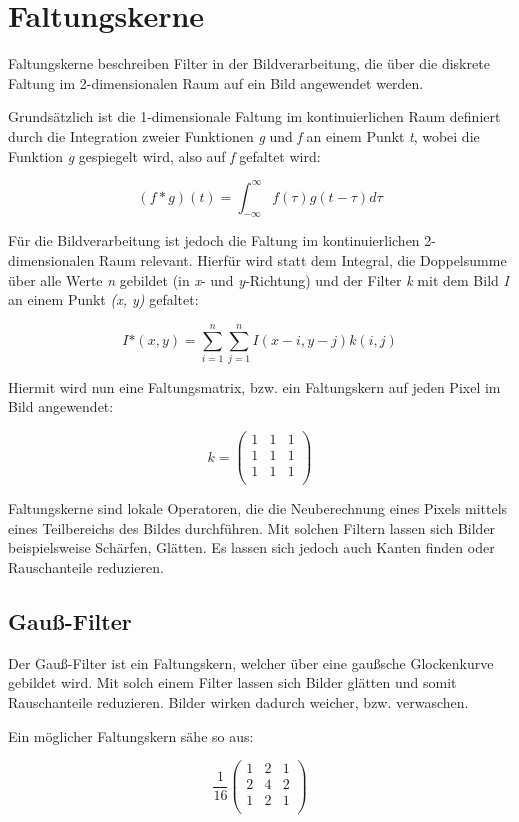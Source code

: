 \section{Faltungskerne} %
\label{sec:Faltungskerne}
Faltungskerne beschreiben Filter in der Bildverarbeitung, die über die diskrete Faltung im 2-dimensionalen
Raum auf ein Bild angewendet werden.

Grundsätzlich ist die 1-dimensionale Faltung im kontinuierlichen Raum definiert durch die Integration zweier Funktionen {\em g} und {\em f} an einem Punkt {\em t}, wobei die Funktion {\em g} gespiegelt wird, also auf {\em f} gefaltet wird:

$$ (f * g)(t) = \int_{-\infty}^{\infty} f(\tau)g(t - \tau) d\tau $$

Für die Bildverarbeitung ist jedoch die Faltung im kontinuierlichen 2-dimensionalen Raum relevant.
Hierfür wird statt dem Integral, die Doppelsumme über alle Werte {\em n} gebildet (in {\em x}- und {\em y}-Richtung) und der Filter {\em k} mit dem Bild {\em I} an einem Punkt {\em (x, y)} gefaltet:

$$ I\mbox{*}(x, y) = \sum_{i=1}^{n}\sum_{j=1}^{n} I(x - i, y - j)k(i, j) $$

Hiermit wird nun eine Faltungsmatrix, bzw. ein Faltungskern auf jeden Pixel im Bild angewendet:

$$ k = \left( \begin{array}{rrr}
1 & 1 & 1 \\
1 & 1 & 1 \\
1 & 1 & 1 \\
\end{array}\right) $$

Faltungskerne sind lokale Operatoren, die die Neuberechnung eines Pixels mittels eines Teilbereichs des Bildes durchführen.
Mit solchen Filtern lassen sich Bilder beispielsweise Schärfen, Glätten. Es lassen sich jedoch auch Kanten finden oder Rauschanteile reduzieren.

\subsection{Gauß-Filter}
Der Gauß-Filter ist ein Faltungskern, welcher über eine gaußsche Glockenkurve gebildet wird.
Mit solch einem Filter lassen sich Bilder glätten und somit Rauschanteile reduzieren.
Bilder wirken dadurch weicher, bzw. verwaschen.

Ein möglicher Faltungskern sähe so aus:

$$ \frac{1}{16} \left( \begin{array}{rrr}
1 & 2 & 1 \\
2 & 4 & 2 \\
1 & 2 & 1 \\
\end{array}\right) $$

